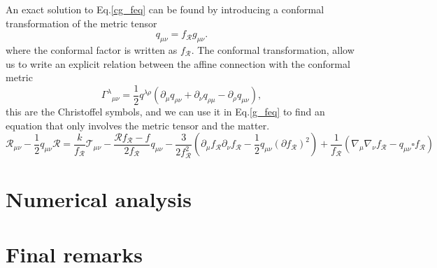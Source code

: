 \documentclass{article}
\begin{document}
An exact solution to Eq.\eqref{cg_feq} can be found by introducing a conformal transformation
of the metric tensor
\begin{equation}
    q_{\mu\nu} = f_{\mathcal{R}}g_{\mu\nu}.
\end{equation}
where the conformal factor is written as $f_{\mathcal{R}}$. The conformal transformation, allow us
to write an explicit relation between the affine connection with the conformal metric
\begin{equation}
    \Gamma^{\lambda}{}_{\mu\nu} = \frac{1}{2}q^{\lambda\rho}\left(\partial_\mu q_{\rho\nu} + 
    \partial_\nu q_{\rho\mu} - \partial_\rho q_{\mu\nu}\right),
\end{equation}
this are the Christoffel symbols, and we can use it in Eq.\eqref{g_feq} to find an equation
that only involves the metric tensor and the matter.
\begin{equation}
    \mathcal{R}_{\mu\nu} - \frac{1}{2}q_{\mu\nu}\mathcal{R} = \frac{k}{f_{\mathcal{R}}}\mathcal{T}_{\mu\nu}
    - \frac{\mathcal{R}f_{\mathcal{R}} - f}{2f_{\mathcal{R}}}q_{\mu\nu} - \frac{3}{2f^2_{\mathcal{R}}}
    \left(\partial_\mu f_{\mathcal{R}} \partial_\nu f_{\mathcal{R}} - \frac{1}{2}q_{\mu\nu}(\partial f_{\mathcal{R}})^2\right)
    + \frac{1}{f_{\mathcal{R}}}\left(\nabla_\mu\nabla_\nu f_{\mathcal{R}} - q_{\mu\nu}\square f_{\mathcal{R}}\right)
\end{equation}
\section{Numerical analysis}
\label{sec:numercal_analysis}

\section{Final remarks}
\label{sec:remarks}
\end{document}
